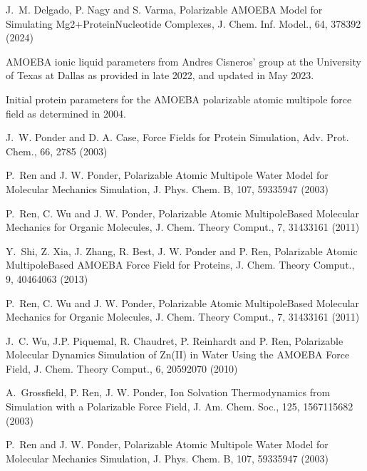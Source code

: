\documentclass[letterpaper,11pt,english]{sphinxmanual}
\begin{document}
\sphinxAtStartPar
J. M. Delgado, P. Nagy and S. Varma, Polarizable AMOEBA Model for Simulating Mg2+\sphinxhyphen{}Protein\sphinxhyphen{}Nucleotide Complexes, J. Chem. Inf. Model., 64, 378\sphinxhyphen{}392 (2024)

\sphinxAtStartPar
{}

\sphinxAtStartPar
AMOEBA ionic liquid parameters from Andres Cisneros’ group at the University of Texas at Dallas as provided in late 2022, and updated in May 2023.

\sphinxAtStartPar
{}

\sphinxAtStartPar
Initial protein parameters for the AMOEBA polarizable atomic multipole force field as determined in 2004.

\sphinxAtStartPar
J. W. Ponder and D. A. Case, Force Fields for Protein Simulation, Adv. Prot. Chem., 66, 27\sphinxhyphen{}85 (2003)

\sphinxAtStartPar
P. Ren and J. W. Ponder, Polarizable Atomic Multipole Water Model for Molecular Mechanics Simulation, J. Phys. Chem. B, 107, 5933\sphinxhyphen{}5947 (2003)

\sphinxAtStartPar
P. Ren, C. Wu and J. W. Ponder, Polarizable Atomic Multipole\sphinxhyphen{}Based Molecular Mechanics for Organic Molecules, J. Chem. Theory Comput., 7, 3143\sphinxhyphen{}3161 (2011)

\sphinxAtStartPar
{}

\sphinxAtStartPar
Y. Shi, Z. Xia, J. Zhang, R. Best, J. W. Ponder and P. Ren, Polarizable Atomic Multipole\sphinxhyphen{}Based AMOEBA Force Field for Proteins, J. Chem. Theory Comput., 9, 4046\sphinxhyphen{}4063 (2013)

\sphinxAtStartPar
P. Ren, C. Wu and J. W. Ponder, Polarizable Atomic Multipole\sphinxhyphen{}Based Molecular Mechanics for Organic Molecules, J. Chem. Theory Comput., 7, 3143\sphinxhyphen{}3161 (2011)

\sphinxAtStartPar
J. C. Wu, J.\sphinxhyphen{}P. Piquemal, R. Chaudret, P. Reinhardt and P. Ren, Polarizable Molecular Dynamics Simulation of Zn(II) in Water Using the AMOEBA Force Field, J. Chem. Theory Comput., 6, 2059\sphinxhyphen{}2070 (2010)

\sphinxAtStartPar
A. Grossfield, P. Ren, J. W. Ponder, Ion Solvation Thermodynamics from Simulation with a Polarizable Force Field, J. Am. Chem. Soc., 125, 15671\sphinxhyphen{}15682 (2003)

\sphinxAtStartPar
P. Ren and J. W. Ponder, Polarizable Atomic Multipole Water Model for Molecular Mechanics Simulation, J. Phys. Chem. B, 107, 5933\sphinxhyphen{}5947 (2003)
\end{document}
